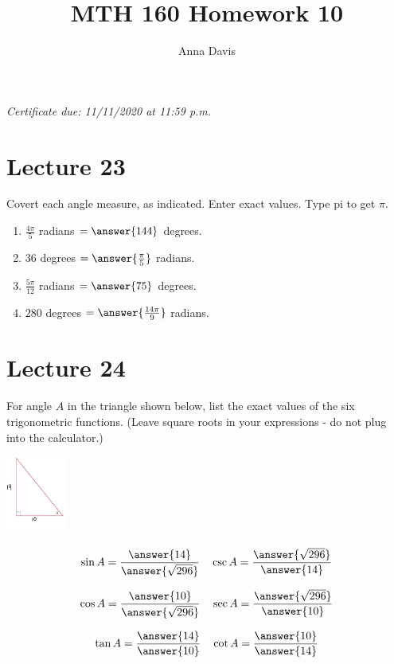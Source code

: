 \documentclass{ximera}
\author{Anna Davis} \title{MTH 160 Homework 10}
\begin{document}
\begin{abstract}

\end{abstract}
\maketitle
 \textit{Certificate due: 11/11/2020 at 11:59 p.m.}
 \section{Lecture 23}
\begin{problem}\label{prob:160hom10prob1}
Covert each angle measure, as indicated.  Enter exact values.  Type pi to get $\pi$.
\begin{enumerate}
    \item $\frac{4\pi}{5}$ radians $=\answer{144}$ degrees.
    \item $36$ degrees $=\answer{\frac{\pi}{5}}$ radians.
    \item $\frac{5\pi}{12}$ radians $=\answer{75}$ degrees.
    \item $280$ degrees $=\answer{\frac{14\pi}{9}}$ radians.
\end{enumerate}
\end{problem}

\section{Lecture 24}

\begin{problem}\label{prob:160hom10prob2}
For angle $A$ in the triangle shown below, list the exact values of the six trigonometric functions. (Leave square roots in your expressions - do not plug into the calculator.)
\begin{image}
   
\includegraphics[height=1in]{160H10pic5.jpg}~
 
\end{image}

$$\sin A=\frac{\answer{14}}{\answer{\sqrt{296}}}\quad \csc A=\frac{\answer{\sqrt{296}}}{\answer{14}}$$

$$\cos A=\frac{\answer{10}}{\answer{\sqrt{296}}}\quad \sec A=\frac{\answer{\sqrt{296}}}{\answer{10}}$$

$$\tan A=\frac{\answer{14}}{\answer{10}}\quad \cot A=\frac{\answer{10}}{\answer{14}}$$
\end{problem}
\end{document}

